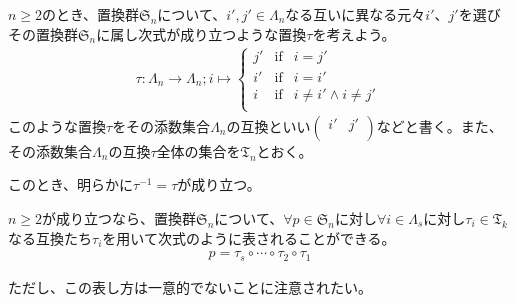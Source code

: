 \documentclass[dvipdfmx]{jsarticle}
\begin{document}
\begin{dfn}
$n \geq 2$のとき、置換群$\mathfrak{S}_{n}$について、$i',j' \in \varLambda_{n}$なる互いに異なる元々$i'$、$j'$を選びその置換群$\mathfrak{S}_{n}$に属し次式が成り立つような置換$\tau$を考えよう。
\begin{align*}
\tau:\varLambda_{n} \rightarrow \varLambda_{n};i \mapsto \left\{ \begin{matrix}
j' & \mathrm{if} & i = j' \\
i' & \mathrm{if} & i = i' \\
i & \mathrm{if} & i \neq i' \land i \neq j' \\
\end{matrix} \right.\ 
\end{align*}
このような置換$\tau$をその添数集合$\varLambda_{n}$の互換といい$\begin{pmatrix}
i' & j' \\
\end{pmatrix}$などと書く。また、その添数集合$\varLambda_{n}$の互換$\tau$全体の集合を$\mathfrak{T}_{n}$とおく。
\end{dfn}\par
このとき、明らかに$\tau^{- 1} = \tau$が成り立つ。
\begin{thm}\label{2.1.10.3}
$n \geq 2$が成り立つなら、置換群$\mathfrak{S}_{n}$について、$\forall p \in \mathfrak{S}_{n}$に対し$\forall i \in \varLambda_{s}$に対し$\tau_{i} \in \mathfrak{T}_{k}$なる互換たち$\tau_{i}$を用いて次式のように表されることができる。\begin{align*}
p = \tau_{s} \circ \cdots \circ \tau_{2} \circ \tau_{1}
\end{align*}
\end{thm}\par
ただし、この表し方は一意的でないことに注意されたい。
\end{document}
